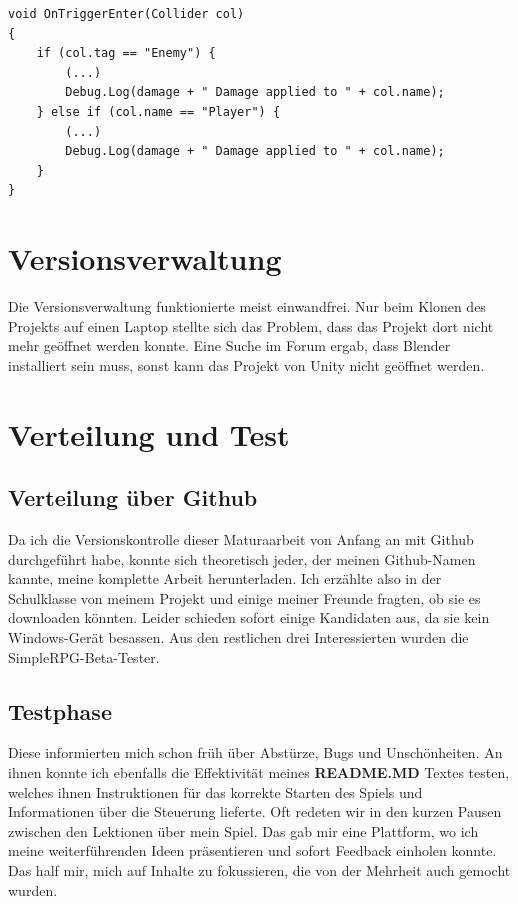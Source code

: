 \begin{lstlisting}[caption={Konsoleausgaben beim Waffeneinsatz}]
void OnTriggerEnter(Collider col)
{
	if (col.tag == "Enemy") {
		(...)
		Debug.Log(damage + " Damage applied to " + col.name);
	} else if (col.name == "Player") {
		(...)
		Debug.Log(damage + " Damage applied to " + col.name);
	}
}
\end{lstlisting}

\newpage
\section{Versionsverwaltung}

Die Versionsverwaltung funktionierte meist einwandfrei. Nur beim Klonen des Projekts auf einen Laptop stellte sich das Problem, dass das Projekt dort nicht mehr geöffnet werden konnte. Eine Suche im Forum ergab, dass Blender installiert sein muss, sonst kann das Projekt von Unity nicht geöffnet werden.

\section{Verteilung und Test}

\subsection{Verteilung über Github}

Da ich die Versionskontrolle dieser Maturaarbeit von Anfang an mit Github durchgeführt habe, konnte sich theoretisch jeder, der meinen Github-Namen kannte, meine komplette Arbeit herunterladen.\cite{csomormaturaarbeit19github}
Ich erzählte also in der Schulklasse von meinem Projekt und einige meiner Freunde fragten, ob sie es downloaden könnten. Leider schieden sofort einige Kandidaten aus, da sie kein Windows-Gerät besassen. Aus den restlichen drei Interessierten wurden die SimpleRPG-Beta-Tester.

\subsection{Testphase}

Diese informierten mich schon früh über Abstürze, Bugs und Unschönheiten.
An ihnen konnte ich ebenfalls die Effektivität meines \textbf{README.MD} Textes testen, welches ihnen Instruktionen für das korrekte Starten des Spiels und Informationen über die Steuerung lieferte.
Oft redeten wir in den kurzen Pausen zwischen den Lektionen über mein Spiel.
Das gab mir eine Plattform, wo ich meine weiterführenden Ideen präsentieren und sofort Feedback einholen konnte. Das half mir, mich auf Inhalte zu fokussieren, die von der Mehrheit auch gemocht wurden.


